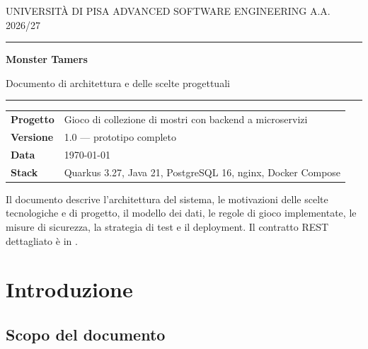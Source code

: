 \documentclass[11pt,a4paper]{report}
\begin{document}
\begin{titlepage}
  \sffamily
  \vspace*{2.5cm}
  {\small UNIVERSITÀ DI PISA \textbullet{} ADVANCED SOFTWARE ENGINEERING \textbullet{} A.A. 2026/27}\par
  \vspace{0.6cm}
  {\color{rule}\rule{\linewidth}{0.6pt}}\par
  \vspace{0.8cm}
  {\fontsize{30}{36}\selectfont\bfseries Monster Tamers}\par
  \vspace{0.4cm}
  {\Large Documento di architettura e delle scelte progettuali}\par
  \vspace{0.8cm}
  {\color{rule}\rule{\linewidth}{0.6pt}}\par
  \vspace{1.2cm}
  \begin{tabular}{@{}ll@{}}
    \textbf{Progetto} & Gioco di collezione di mostri con backend a microservizi \\
    \textbf{Versione} & 1.0 — prototipo completo \\
    \textbf{Data} & \today \\
    \textbf{Stack} & Quarkus 3.27, Java 21, PostgreSQL 16, nginx, Docker Compose \\
  \end{tabular}
  \vfill
  \rmfamily\small
  Il documento descrive l'architettura del sistema, le motivazioni delle scelte tecnologiche e di progetto, il modello dei dati, le regole di gioco implementate, le misure di sicurezza, la strategia di test e il deployment. Il contratto REST dettagliato è in .
\end{titlepage}

\tableofcontents
\clearpage
{}

\chapter{Introduzione}

\section{Scopo del documento}
\end{document}
